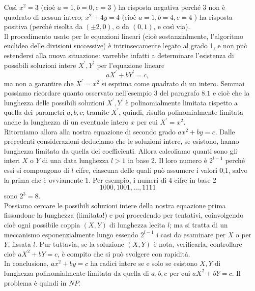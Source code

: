 \begin{enumerate}
\begin{itemize}
          \end{itemize}
          Così $x^2=3$ (cioè $a=1, b=0, c=3$ ) ha risposta negativa perché 3 non
          è quadrato di nessun intero; $x^2+4 y=4$ (cioè $a=1, b=4, c=4$ ) ha
          risposta positiva (perché risolta da $(\pm 2,0)$, o da $(0,1)$, e così
          via).\\
          Il procedimento usato per le equazioni lineari (cioè sostanzialmente,
          l'algoritmo euclideo delle divisioni successive) è intrinsecamente
          legato al grado 1, e non può estendersi alla nuova situazione:
          varrebbe infatti a determinare l'esistenza di possibili soluzioni
          intere $X^{\prime}, Y^{\prime}$ per l'equazione lineare
          $$
              a X^{\prime}+b Y^{\prime}=c,
          $$
          ma non a garantire che $X^{\prime}=x^2$ si esprima come quadrato di un
          intero. Semmai possiamo ricordare quanto osservato nell'esempio 3 del
          paragrafo $8.1$ e cioè che la lunghezza delle possibili soluzioni
          $X^{\prime}, Y^{\prime}$ è polinomialmente limitata rispetto a quella
          dei parametri $a, b, c$; tramite $X^{\prime}$, quindi, risulta
          polinomialmente limitata anche la lunghezza di un eventuale intero $x$
          per cui $X^{\prime}=x^2$.\\
          Ritorniamo allora alla nostra equazione di
          secondo grado $a x^2+b y=c$. Dalle precedenti considerazioni deduciamo
          che le soluzioni intere, se esistono, hanno lunghezza limitata da
          quella dei coefficienti. Allora calcoliamo quanti sono gli interi $X$
          o $Y$ di una data lunghezza $l>1$ in base 2. Il loro numero è
          $2^{l-1}$ perché essi si compongono di $l$ cifre, ciascuna delle quali
          può assumere i valori 0,1, salvo la prima che è ovviamente 1. Per
          esempio, i numeri di 4 cifre in base 2
          $$
              1000,1001, \ldots, 1111
          $$
          sono $2^3=8$.\\
          Possiamo cercare le possibili soluzioni intere della
          nostra equazione prima fissandone la lunghezza (limitata!) e poi
          procedendo per tentativi, coinvolgendo cioè ogni possibile coppia $(X,
              Y)$ di lunghezza lecita $l$; ma si tratta di un meccanismo
          esponenzialmente lungo essendo $2^{l-1}$ i casi da esaminare
          per $X$ o per $Y$, fissata $l$. Pur tuttavia, se la soluzione $(X, Y)$
          è nota, verificarla, controllare cioè $a X^2+b Y=c$, è compito che si
          può svolgere con rapidità.\\
          In conclusione, $a x^2+b y=c$ ha radici
          intere se e solo se esistono $X, Y$ di lunghezza polinomialmente
          limitata da quella di $a, b, c$ per cui $a X^2+b Y=c$. Il problema è
          quindi in $N P$.


\end{enumerate}
